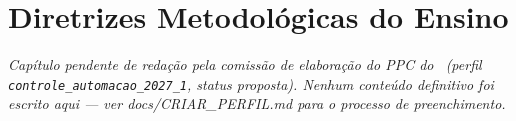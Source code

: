 \chapter{Diretrizes Metodológicas do Ensino}

\textit{Capítulo pendente de redação pela comissão de elaboração do PPC do
\ppccurso\ (perfil \texttt{controle\_automacao\_2027\_1}, status
proposta). Nenhum conteúdo definitivo foi escrito aqui — ver
docs/CRIAR\_PERFIL.md para o processo de preenchimento.}
